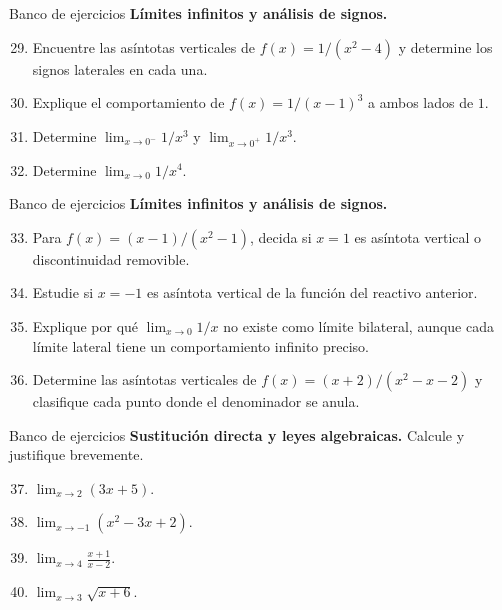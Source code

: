 \documentclass[12pt,aspectratio=169]{beamer}
\begin{document}
\begin{frame}[t,allowframebreaks]{Banco de ejercicios}
\small
\noindent \textbf{Límites infinitos y análisis de signos.}\par\smallskip
\begin{enumerate}\setcounter{enumi}{28}
\item Encuentre las asíntotas verticales de $f(x)=1/(x^2-4)$ y determine los signos laterales en cada una.
\item Explique el comportamiento de $f(x)=1/(x-1)^3$ a ambos lados de $1$.
\item Determine $\lim_{x\to0^-}1/x^3$ y $\lim_{x\to0^+}1/x^3$.
\item Determine $\lim_{x\to0}1/x^4$.
\end{enumerate}
\end{frame}


\begin{frame}[t,allowframebreaks]{Banco de ejercicios}
\small
\noindent \textbf{Límites infinitos y análisis de signos.}\par\smallskip
\begin{enumerate}\setcounter{enumi}{32}
\item Para $f(x)=(x-1)/(x^2-1)$, decida si $x=1$ es asíntota vertical o discontinuidad removible.
\item Estudie si $x=-1$ es asíntota vertical de la función del reactivo anterior.
\item Explique por qué $\lim_{x\to0}1/x$ no existe como límite bilateral, aunque cada límite lateral tiene un comportamiento infinito preciso.
\item Determine las asíntotas verticales de $f(x)=(x+2)/(x^2-x-2)$ y clasifique cada punto donde el denominador se anula.
\end{enumerate}
\end{frame}


\begin{frame}[t,allowframebreaks]{Banco de ejercicios}
\small
\noindent \textbf{Sustitución directa y leyes algebraicas.} Calcule y justifique brevemente.\par\smallskip
\begin{enumerate}\setcounter{enumi}{36}
\item $\displaystyle\lim_{x\to2}(3x+5)$.
\item $\displaystyle\lim_{x\to-1}(x^2-3x+2)$.
\item $\displaystyle\lim_{x\to4}\frac{x+1}{x-2}$.
\item $\displaystyle\lim_{x\to3}\sqrt{x+6}$.
\end{enumerate}
\end{frame}
\end{document}
